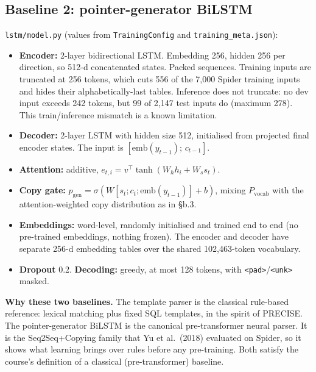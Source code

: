 \documentclass[
  10pt,
]{article}
\providecommand{\tightlist}{%
  \setlength{\itemsep}{0pt}\setlength{\parskip}{0pt}}
\begin{document}
\subsection{Baseline 2: pointer-generator
BiLSTM}\label{baseline-2-pointer-generator-bilstm}

\texttt{lstm/model.py} (values from \texttt{TrainingConfig} and
\texttt{training\_meta.json}):

\begin{itemize}
\tightlist
\item
  \textbf{Encoder:} 2-layer bidirectional LSTM. Embedding 256, hidden
  256 per direction, so 512-d concatenated states. Packed sequences.
  Training inputs are truncated at 256 tokens, which cuts 556 of the
  7,000 Spider training inputs and hides their alphabetically-last
  tables. Inference does not truncate: no dev input exceeds 242 tokens,
  but 99 of 2,147 test inputs do (maximum 278). This train/inference
  mismatch is a known limitation.
\item
  \textbf{Decoder:} 2-layer LSTM with hidden size 512, initialised from
  projected final encoder states. The input is
  \([\text{emb}(y_{t-1});\,c_{t-1}]\).
\item
  \textbf{Attention:} additive,
  \(e_{t,i}=v^\top\tanh(W_h h_i+W_s s_t)\).
\item
  \textbf{Copy gate:}
  \(p_{\text{gen}}=\sigma(W[s_t;c_t;\text{emb}(y_{t-1})]+b)\), mixing
  \(P_{\text{vocab}}\) with the attention-weighted copy distribution as
  in §b.3.
\item
  \textbf{Embeddings:} word-level, randomly initialised and trained end
  to end (no pre-trained embeddings, nothing frozen). The encoder and
  decoder have separate 256-d embedding tables over the shared
  102,463-token vocabulary.
\item
  \textbf{Dropout} 0.2. \textbf{Decoding:} greedy, at most 128 tokens,
  with
  \texttt{\textless{}pad\textgreater{}}/\texttt{\textless{}unk\textgreater{}}
  masked.
\end{itemize}

\textbf{Why these two baselines.} The template parser is the classical
rule-based reference: lexical matching plus fixed SQL templates, in the
spirit of PRECISE. The pointer-generator BiLSTM is the canonical
pre-transformer neural parser. It is the Seq2Seq+Copying family that Yu
et al.~(2018) evaluated on Spider, so it shows what learning brings over
rules before any pre-training. Both satisfy the course's definition of a
classical (pre-transformer) baseline.
\end{document}
